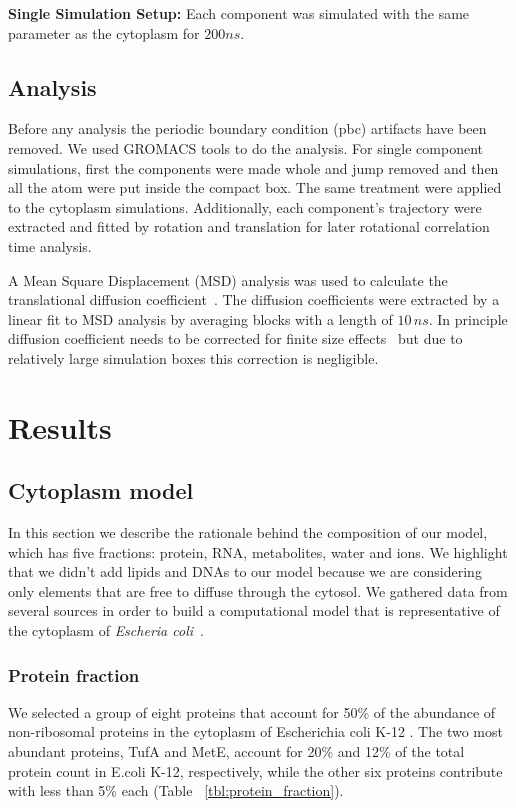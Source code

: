 \documentclass[journal=jacsat,manuscript=article]{achemso}
\begin{document}
{\bf Single Simulation Setup: } Each component was simulated with the same parameter as the cytoplasm for $200 ns$.

\subsection*{Analysis}
Before any analysis the periodic boundary condition (pbc) artifacts have been removed. We used GROMACS tools to do the analysis. For single component simulations, first the components were made whole and jump removed and then all the atom were put inside the compact box. The same treatment were applied to the cytoplasm simulations. Additionally, each component's trajectory were extracted and fitted by rotation and translation for later rotational correlation time analysis. 


A Mean Square Displacement (MSD) analysis was used to calculate the translational diffusion coefficient~\cite{Allen1987a}. The diffusion coefficients were extracted by a linear fit to MSD analysis by averaging blocks with a length of $10 \,ns$. In principle diffusion coefficient needs to be corrected for finite size effects~\cite{Yeh2004} but due to relatively large simulation boxes this correction is negligible.




\section*{Results}

\subsection{Cytoplasm model}
In this section we describe the rationale behind the composition of our model, which has five fractions: protein, RNA, metabolites, water and ions. We highlight that we didn't add lipids and DNAs to our model because we are considering only elements that are free to diffuse through the cytosol. We gathered data from several sources in order to build a computational model that is representative of the cytoplasm of {\em Escheria coli}~\cite{Dong1996,Bennett2009,Link1997,Mcguffee2010}.

\subsubsection{Protein fraction}
We selected a group of eight proteins that account for 50\% of the abundance of non-ribosomal proteins in the cytoplasm of Escherichia coli K-12 \cite{ref_prot_abundance}. The two most abundant proteins, TufA and MetE, account for 20\% and 12\% of the total protein count in E.coli K-12, respectively, while the other six proteins contribute with less than 5\% each (Table ~\ref{tbl:protein_fraction}).
\end{document}
